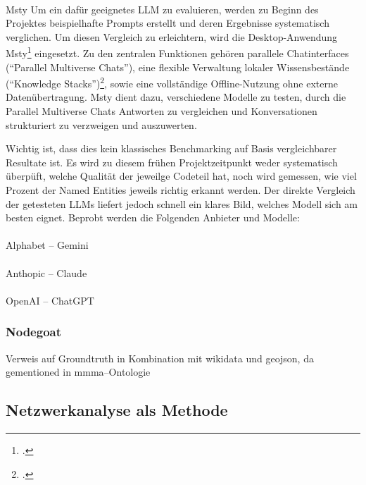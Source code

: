 \documentclass[12pt, a4paper, ngerman, bidi=default]{article}
\makeatletter
\let\cite\footcite
\let\oldparagraph\paragraph%
\renewcommand{\paragraph}{
    \@ifstar%
      \xxxParagraphStar%
      \xxxParagraphNoStar%
 }
\newcommand{\xxxParagraphStar}[1]{\oldparagraph*{#1}\mbox{}}
\newcommand{\xxxParagraphNoStar}[1]{\oldparagraph{#1}\mbox{}}
\makeatother
\begin{document}
\paragraph{Msty}
Um ein dafür geeignetes LLM zu evaluieren, werden zu Beginn des Projektes beispielhafte Prompts erstellt und deren Ergebnisse systematisch verglichen. Um diesen Vergleich zu erleichtern, wird die Desktop-Anwendung Msty\cite[vgl][]{noauthor_msty_nodate} eingesetzt. Zu den zentralen Funktionen gehören parallele Chatinterfaces (\enquote{Parallel Multiverse Chats}),
eine flexible Verwaltung lokaler Wissensbestände (\enquote{Knowledge Stacks})\cite[vgl][]{noauthor_msty_nodate}, sowie eine vollständige Offline-Nutzung ohne externe Datenübertragung. Msty dient dazu, verschiedene Modelle zu testen, durch die Parallel Multiverse Chats Antworten zu vergleichen und Konversationen strukturiert zu verzweigen und auszuwerten.

Wichtig ist, dass dies kein klassisches Benchmarking auf Basis vergleichbarer Resultate ist. Es wird zu diesem frühen Projektzeitpunkt weder systematisch überpüft, welche Qualität der jeweilge Codeteil hat, noch wird gemessen, wie viel Prozent der Named Entities jeweils richtig erkannt werden. Der direkte Vergleich der getesteten LLMs liefert jedoch schnell ein klares Bild, welches Modell sich am besten eignet. Beprobt werden die Folgenden Anbieter und Modelle:



\paragraph{Alphabet – Gemini}
\paragraph{Anthopic – Claude}
\paragraph{OpenAI – ChatGPT}


\subsubsection{Nodegoat}\label{subsec:Nodegoat_chapter}

Verweis auf Groundtruth in Kombination mit wikidata und geojson, da gementioned in mmma–Ontologie
\subsection{Netzwerkanalyse als Methode}
\end{document}
